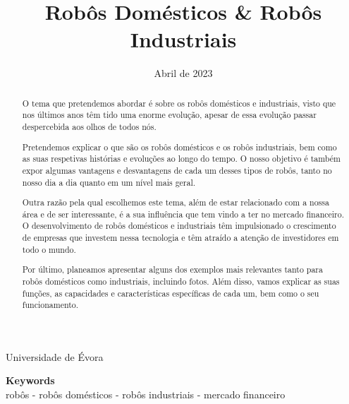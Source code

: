 \documentclass[10pt]{article}
\title{Robôs Domésticos \& Robôs Industriais}
\date{Abril de 2023}
\begin{document}
\maketitle
\begin{center}
    \Large Universidade de Évora
\end{center}

\renewcommand\abstractname{Abstract}
\begin{abstract}
O tema que pretendemos abordar é sobre os robôs domésticos e industriais, visto que nos últimos anos têm tido uma enorme evolução, apesar de essa evolução passar despercebida aos olhos de todos nós.

Pretendemos explicar o que são os robôs domésticos e os robôs industriais, bem como as suas respetivas histórias e evoluções ao longo do tempo. O nosso objetivo é também expor algumas vantagens e desvantagens de cada um desses tipos de robôs, tanto no nosso dia a dia quanto em um nível mais geral.

Outra razão pela qual escolhemos este tema, além de estar relacionado com a nossa área e de ser interessante, é a sua influência que tem vindo a ter no mercado financeiro. O desenvolvimento de robôs domésticos e industriais têm impulsionado o crescimento de empresas que investem nessa tecnologia e têm atraído a atenção de investidores em todo o mundo.

Por último, planeamos apresentar alguns dos exemplos mais relevantes tanto para robôs domésticos como industriais, incluindo fotos. Além disso, vamos explicar as suas funções, as capacidades e características específicas de cada um, bem como o seu funcionamento.
\end{abstract}

\begin{center}
\textbf{Keywords} \\
robôs - robôs domésticos - robôs industriais - mercado financeiro
\end{center}

%
\end{document}
